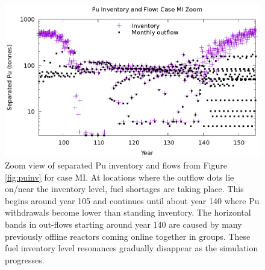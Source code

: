 \documentclass{style}
\begin{document}
\begin{figure}[!h]
    \centering
    \includegraphics[width=1.0\textwidth]{exp2/puinv-MI.eps}
    \caption[Separated Pu inventory and flow: Case MI Zoom]{
        Zoom view of separated Pu inventory and flows from Figure \ref{fig:puinv} for case MI.  At locations where the
        outflow dots lie on/near the inventory level, fuel shortages are
        taking place.  This begins around year 105 and continues until about
        year 140 where Pu withdrawals become lower than standing inventory.
        The horizontal bands in out-flows starting around year 140 are caused
        by many previously offline reactors coming online together in groups.
        These fuel inventory level resonances gradually disappear as the
        simulation progresses.
    }
    \label{fig:puinv-MI}
\end{figure}
\end{document}
